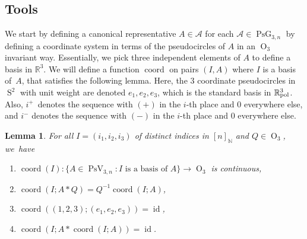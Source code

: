 \documentclass[11pt]{article}
\numberwithin{equation}{section}
\newtheorem{lemma}[theorem]{Lemma}
\theoremstyle{remark}
\let\mc\mathcal
\let\mb\mathbb
\DeclareMathOperator{\pg}{PsG}
\DeclareMathOperator{\orth}{O}
\DeclareMathOperator{\pstief}{PsV}
\DeclareMathOperator{\sphere}{S}
\newcommand{\Rpol}[1]{\mb{R}\mathrlap{{}^{#1}}{}_\text{pol}}
\DeclareMathOperator{\coord}{coord}
\DeclareMathOperator{\id}{id}
\begin{document}
\subsection{Tools}

We start by defining a canonical representative $A \in \mc{A}$ for each \hbox{$\mc{A} \in \pg_{3,n}$} by defining a coordinate system in terms of the pseudocircles of $A$ in an $\orth_3$ invariant way. Essentially, we pick three independent elements of $A$ to define a basis in $\mb{R}^3$.
We will define a function $\coord$
on pairs $(I,A)$ where $I$ is a basis of~$A$, that satisfies the following lemma.
Here, the $3$ coordinate pseudocircles in $\sphere^2$ with unit weight are denoted $e_1,e_2,e_3$, which is the standard basis in $\Rpol{3}$.
Also, $i^+$~denotes the sequence with $(+)$ in the $i$-th place and $0$ everywhere else, and $i^-$ denotes the sequence with $(-)$ in the $i$-th place and $0$ everywhere else.

\begin{lemma}\label{lemma-basis}
For all $I = (i_1,i_2,i_3)$ of distinct indices in $[n]_\mb{N}$ and $Q \in \orth_3$, we~have
\begin{enumerate}
\item \label{lemma-basis-continuous}
$ \coord(I) : \{A \in \pstief_{3,n} : I \text{ is a basis of } A \} \to \orth_3 $
is continuous,
\item \label{lemma-basis-equivariant}
$\coord(I;A*Q) =Q^{-1}\coord(I;A)$,
\item \label{lemma-basis-identity}
$ \coord((1,2,3);(e_1,e_2,e_3)) = \id$,
\item \label{lemma-basis-idempotent}
$\coord(I;A*\coord(I;A)) = \id$.
\end{enumerate}
\end{lemma}
\end{document}
